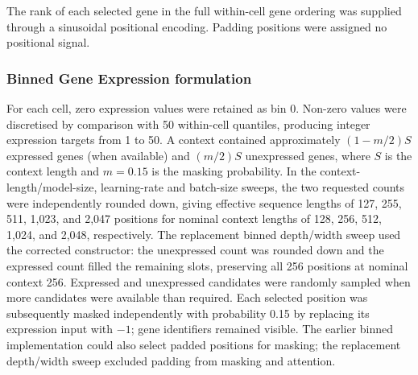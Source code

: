 \documentclass[pdflatex,sn-nature]{sn-jnl}%
\theoremstyle{thmstyleone}%
\theoremstyle{thmstyletwo}%
\theoremstyle{thmstylethree}%
\begin{document}
The rank of each selected gene in the full within-cell gene ordering was supplied through a sinusoidal positional encoding.
Padding positions were assigned no positional signal.

\subsubsection{Binned Gene Expression formulation}
\label{sec:binned-loss}

For each cell, zero expression values were retained as bin 0.
Non-zero values were discretised by comparison with 50 within-cell quantiles, producing integer expression targets from 1 to 50.
A context contained approximately \((1-m/2)S\) expressed genes (when available) and \((m/2)S\) unexpressed genes, where \(S\) is the context length and \(m=0.15\) is the masking probability.
In the context-length/model-size, learning-rate and batch-size sweeps, the two requested counts were independently rounded down, giving effective sequence lengths of 127, 255, 511, 1,023, and 2,047 positions for nominal context lengths of 128, 256, 512, 1,024, and 2,048, respectively.
The replacement binned depth/width sweep used the corrected constructor: the unexpressed count was rounded down and the expressed count filled the remaining slots, preserving all 256 positions at nominal context 256.
Expressed and unexpressed candidates were randomly sampled when more candidates were available than required.
Each selected position was subsequently masked independently with probability 0.15 by replacing its expression input with \(-1\); gene identifiers remained visible.
The earlier binned implementation could also select padded positions for masking; the replacement depth/width sweep excluded padding from masking and attention.
\end{document}
